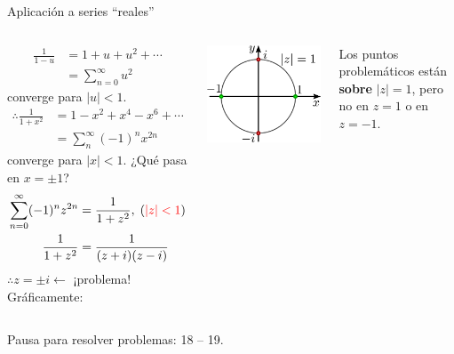 \documentclass[9pt, aspectratio=169]{beamer}
\begin{document}
\begin{frame}{Aplicación a series ``reales''}
	\begin{columns}[c]
		\begin{align*}
			\frac{1}{1 - u} & = 1 + u + u^2 + \cdots      \\
			                & = \sum_{n = 0}^{\infty} u^2
		\end{align*}
		converge para $|u| < 1$.
		\begin{align*}
			\therefore \frac{1}{1 + x^2} & = 1 - x^2 + x^4 - x^6 + \cdots    \\
			                             & = \sum_{n}^{\infty} (-1)^n x^{2n}
		\end{align*}
		converge para $|x| < 1$.
		¿Qué pasa en $x = \pm 1$?
		\begin{align*}
			\sum_{n = 0}^{\infty} (-1)^n z^{2n} & = \frac{1}{1 + z^2}, \; ({\color{red}|z| < 1}) \\
			\frac{1}{1 + z^2}                   & = \frac{1}{(z + i)(z -i)}
		\end{align*}
		$\therefore z = \pm i \leftarrow $ \alert{¡problema!}
		Gráficamente:
		\begin{center}
			\includegraphics[scale=0.40]{figs/fig-14.pdf}
		\end{center}
		Los puntos problemáticos están \textbf{sobre} $|z| = 1$, pero no en $z = 1$ o en $z = -1$.
	\end{columns}
\end{frame}


\begin{frame}[standout]
	Pausa para resolver problemas: 18 -- 19.
\end{frame}
\end{document}
